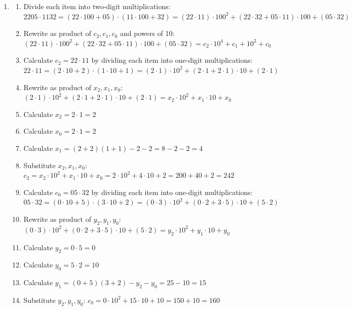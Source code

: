 \documentclass[a4paper,10pt]{article}
\begin{document}
\begin{enumerate}
\begin{enumerate}[(a)]
\end{enumerate}

\item \begin{enumerate}[Step 1.]
	\item Divide each item into two-digit multiplications: $2205 \cdot 1132 = (22 \cdot 100 + 05) \cdot (11 \cdot 100 + 32) = (22 \cdot 11) \cdot 100^2 + (22 \cdot 32 + 05 \cdot 11) \cdot 100 + (05 \cdot 32)$
	\item Rewrite as product of $c_2, c_1, c_0$ and powers of 10: $(22 \cdot 11) \cdot 100^2 + (22 \cdot 32 + 05 \cdot 11) \cdot 100 + (05 \cdot 32) = c_2 \cdot 10^4 + c_1 + 10^2 + c_0$
	
	\item Calculate $c_2 = 22 \cdot 11$ by dividing each item into one-digit multiplications: $22 \cdot 11 = (2 \cdot 10 + 2) \cdot (1 \cdot 10 + 1) = (2 \cdot 1) \cdot 10^2 + (2 \cdot 1 + 2 \cdot 1) \cdot 10 + (2 \cdot 1)$

	\item Rewrite as product of $x_2, x_1, x_0$: $(2 \cdot 1) \cdot 10^2 + (2 \cdot 1 + 2 \cdot 1) \cdot 10 + (2 \cdot 1) = x_2 \cdot 10^2 + x_1 \cdot 10 + x_0$
	\item Calculate $x_2 = 2 \cdot 1 = 2$
	\item Calculate $x_0 = 2 \cdot 1 = 2$
	\item Calculate $x_1 = (2 + 2)(1 + 1) - 2 - 2 = 8 - 2 - 2 = 4$
	\item Substitute $x_2, x_1, x_0$: $c_2 = x_2 \cdot 10^2 + x_1 \cdot 10 + x_0 = 2 \cdot 10^2 + 4 \cdot 10 + 2 = 200 + 40 + 2 = 242$
	
	\item Calculate $c_0 = 05 \cdot 32$ by dividing each item into one-digit multiplications: $05 \cdot 32 = (0 \cdot 10 + 5) \cdot (3 \cdot 10 + 2) = (0 \cdot 3) \cdot 10^2 + (0 \cdot 2 + 3 \cdot 5) \cdot 10 + (5 \cdot 2)$
	\item Rewrite as product of $y_2, y_1, y_0$: $(0 \cdot 3) \cdot 10^2 + (0 \cdot 2 + 3 \cdot 5) \cdot 10 + (5 \cdot 2) = y_2 \cdot 10^2 + y_1 \cdot 10 + y_0$
	\item Calculate $y_2 = 0 \cdot 5 = 0$
	\item Calculate $y_0 = 5 \cdot 2 = 10$
	\item Calculate $y_1 = (0 + 5)(3 + 2) - y_2 - y_0 = 25 - 10 = 15$
	\item Substitute $y_2, y_1, y_0$: $c_0 = 0 \cdot 10^2 + 15 \cdot 10 + 10 = 150 + 10 = 160$
	

\end{enumerate}
\end{enumerate}
\end{document}
